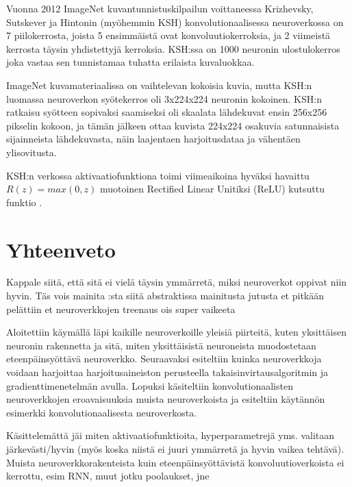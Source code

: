 \documentclass[finnish]{tktltiki2}
\theoremstyle{definition}
\theoremstyle{remark}
\begin{document}
    Vuonna 2012 ImageNet kuvantunnistuskilpailun voittaneessa Krizhevsky, Sutskever ja Hintonin (myöhemmin KSH) konvolutionaalisessa neuroverkossa on 7 piilokerrosta, joista 5 ensimmäistä ovat konvoluutiokerroksia, ja 2 viimeistä kerrosta täysin yhdistettyjä kerroksia. KSH:ssa on 1000 neuronin ulostulokerros joka vastaa sen tunnistamaa tuhatta erilaista kuvaluokkaa.
    
    ImageNet kuvamateriaalissa on vaihtelevan kokoisia kuvia, mutta KSH:n luomassa neuroverkon syötekerros oli 3x224x224 neuronin kokoinen. KSH:n ratkaisu syötteen sopivaksi saamiseksi oli skaalata lähdekuvat ensin 256x256 pikselin kokoon, ja tämän jälkeen ottaa kuvista 224x224 osakuvia satunnaisista sijainneista lähdekuvasta, näin laajentaen harjoitusdataa ja vähentäen ylisovitusta.
    
    KSH:n verkossa aktivaatiofunktiona toimi viimeaikoina hyväksi havaittu $R(z) = max(0, z)$ muotoinen Rectified Linear Unitiksi (ReLU) kutsuttu funktio \cite{KSHimagenet2012}.



\section{Yhteenveto} 

Kappale siitä, että sitä ei vielä täysin ymmärretä, miksi neuroverkot oppivat niin hyvin. Täs vois mainita \cite{neural-optimization-goodfellow-2015} :sta siitä abstraktissa mainitusta jutusta et pitkään pelättiin et neuroverkkojen treenaus ois super vaikeeta

Aloitettiin käymällä läpi kaikille neuroverkoille yleisiä piirteitä, kuten yksittäisen neuronin rakennetta ja sitä, miten yksittäisistä neuroneista muodostetaan eteenpäinsyöttävä neuroverkko. Seuraavaksi esiteltiin kuinka neuroverkkoja voidaan harjoittaa harjoitusaineiston perusteella takaisinvirtausalgoritmin ja gradienttimenetelmän avulla. Lopuksi käsiteltiin konvolutionaalisten neuroverkkojen eroavaisuuksia muista neuroverkoista ja esiteltiin käytännön esimerkki konvolutionaalisesta neuroverkosta.

Käsittelemättä jäi miten aktivaatiofunktioita, hyperparametrejä yms. valitaan järkevästi/hyvin (myös koska niistä ei juuri ymmärretä ja hyvin vaikea tehtävä). Muista neuroverkkorakenteista kuin eteenpäinsyöttävistä konvoluutioverkoista ei kerrottu, esim RNN, muut jotku poolaukset, jne
\end{document}
